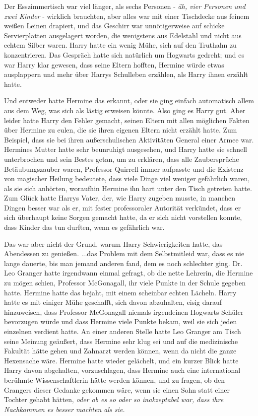 Der Esszimmertisch war viel länger, als sechs Personen -\emph{ äh, vier Personen
und zwei Kinder }- wirklich brauchten, aber alles war mit einer Tischdecke aus
feinem weißen Leinen drapiert, und das Geschirr war unnötigerweise auf schicke
Servierplatten ausgelagert worden, die wenigstens aus Edelstahl und nicht aus
echtem Silber waren. Harry hatte ein wenig Mühe, sich auf den Truthahn zu
konzentrieren. Das Gespräch hatte sich natürlich um Hogwarts gedreht; und es war
Harry klar gewesen, dass seine Eltern hofften, Hermine würde etwas ausplappern
und mehr über Harrys Schulleben erzählen, als Harry ihnen erzählt hatte.

Und entweder hatte Hermine das erkannt, oder sie ging einfach automatisch allem
aus dem Weg, was sich als lästig erweisen könnte. Also ging es Harry gut. Aber
leider hatte Harry den Fehler gemacht, seinen Eltern mit allen möglichen Fakten
über Hermine zu eulen, die sie ihren eigenen Eltern nicht erzählt hatte. Zum
Beispiel, dass sie bei ihren außerschulischen Aktivitäten General einer Armee
war. Hermines Mutter hatte sehr beunruhigt ausgesehen, und Harry hatte sie
schnell unterbrochen und sein Bestes getan, um zu erklären, dass alle
Zaubersprüche Betäubungszauber waren, Professor Quirrell immer aufpasste und die
Existenz von magischer Heilung bedeutete, dass viele Dinge viel weniger
gefährlich waren, als sie sich anhörten, woraufhin Hermine ihn hart unter den
Tisch getreten hatte. Zum Glück hatte Harrys Vater, der, wie Harry zugeben
musste, in manchen Dingen besser war als er, mit fester professoraler Autorität
verkündet, dass er sich überhaupt keine Sorgen gemacht hatte, da er sich nicht
vorstellen konnte, dass Kinder das tun durften, wenn es gefährlich war.

Das war aber nicht der Grund, warum Harry Schwierigkeiten hatte, das Abendessen
zu genießen. ...das Problem mit dem Selbstmitleid war, dass es nie lange
dauerte, bis man jemand anderen fand, dem es noch schlechter ging. Dr. Leo
Granger hatte irgendwann einmal gefragt, ob die nette Lehrerin, die Hermine zu
mögen schien, Professor McGonagall, ihr viele Punkte in der Schule gegeben
hatte. Hermine hatte das bejaht, mit einem scheinbar echten Lächeln. Harry hatte
es mit einiger Mühe geschafft, sich davon abzuhalten, eisig darauf hinzuweisen,
dass Professor McGonagall niemals irgendeinen Hogwarts-Schüler bevorzugen würde
und dass Hermine viele Punkte bekam, weil sie sich jeden einzelnen verdient
hatte. An einer anderen Stelle hatte Leo Granger am Tisch seine Meinung
geäußert, dass Hermine sehr klug sei und auf die medizinische Fakultät hätte
gehen und Zahnarzt werden können, wenn da nicht die ganze Hexensache wäre.
Hermine hatte wieder gelächelt, und ein kurzer Blick hatte Harry davon
abgehalten, vorzuschlagen, dass Hermine auch eine international berühmte
Wissenschaftlerin hätte werden können, und zu fragen, ob den Grangers dieser
Gedanke gekommen wäre, wenn sie einen Sohn statt einer Tochter gehabt hätten,
\emph{oder ob es so oder so inakzeptabel war, dass ihre Nachkommen es besser
machten als sie.}


